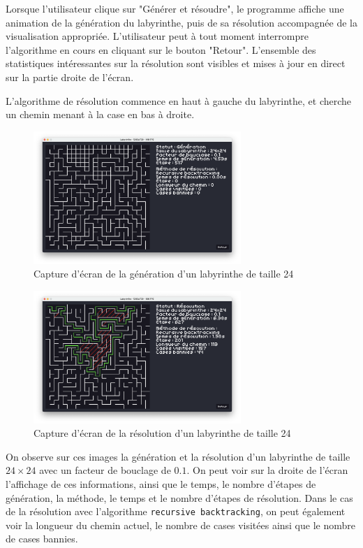 \documentclass[12pt]{scrreprt} %
\begin{document}
Lorsque l'utilisateur clique sur "Générer et résoudre", le programme affiche une animation de la génération du labyrinthe, puis de sa résolution accompagnée de la visualisation appropriée. L'utilisateur peut à tout moment interrompre l'algorithme en cours en cliquant sur le bouton "Retour". L'ensemble des statistiques intéressantes sur la résolution sont visibles et mises à jour en direct sur la partie droite de l'écran.

L'algorithme de résolution commence en haut à gauche du labyrinthe, et cherche un chemin menant à la case en bas à droite.

\begin{figure}[h]
    \centering
    \includegraphics[width=0.70\textwidth]{images/labyrinthgeneratingsmall.png}
    \caption{Capture d'écran de la génération d'un labyrinthe de taille 24}
\end{figure}

\begin{figure}[h]
    \centering
    \includegraphics[width=0.70\textwidth]{images/recbacsolving24.png}
    \caption{Capture d'écran de la résolution d'un labyrinthe de taille 24}
\end{figure}


On observe sur ces images la génération et la résolution d'un labyrinthe de taille $24 \times 24$ avec un facteur de bouclage de $0.1$. On peut voir sur la droite de l'écran l'affichage de ces informations, ainsi que le temps, le nombre d'étapes de génération, la méthode, le temps et le nombre d'étapes de résolution. Dans le cas de la résolution avec l'algorithme \texttt{recursive backtracking}, on peut également voir la longueur du chemin actuel, le nombre de cases visitées ainsi que le nombre de cases bannies.
\end{document}
